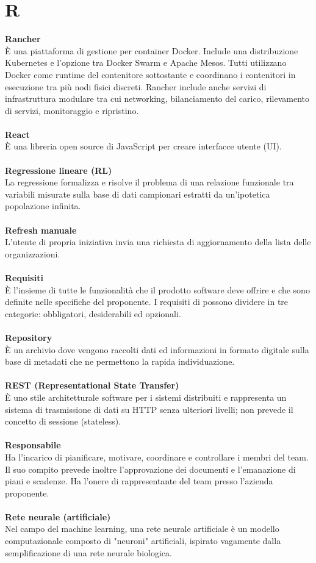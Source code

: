 \section{R}
\textbf{Rancher}\\
È una piattaforma di gestione per container Docker. Include una distribuzione Kubernetes e l'opzione tra Docker Swarm e Apache Mesos. Tutti utilizzano Docker come runtime del contenitore sottostante e coordinano i contenitori in esecuzione tra più nodi fisici discreti. Rancher include anche servizi di infrastruttura modulare tra cui networking, bilanciamento del carico, rilevamento di servizi, monitoraggio e ripristino. \\ \\
\textbf{React}\\
È una libreria open source di JavaScript per creare interfacce utente (UI). \\ \\
\textbf{Regressione lineare (RL)}\\
La regressione formalizza e risolve il problema di una relazione funzionale tra variabili misurate sulla base di dati campionari estratti da un'ipotetica popolazione infinita. \\ \\
\textbf{Refresh manuale}\\
L'utente di propria iniziativa invia una richiesta di aggiornamento della lista delle organizzazioni. \\ \\
\textbf{Requisiti}\\
È l'insieme di tutte le funzionalità che il prodotto software deve offrire e che sono definite nelle specifiche del proponente. I requisiti di possono dividere in tre categorie: obbligatori, desiderabili ed opzionali.\\ \\
\textbf{Repository}\\
È un archivio dove vengono raccolti dati ed informazioni in formato digitale sulla base di metadati che ne permettono la rapida individuazione. \\ \\
\textbf{REST (Representational State Transfer)}\\
È uno stile architetturale software per i sistemi distribuiti e rappresenta un sistema di trasmissione di dati su HTTP senza ulteriori livelli; non prevede il concetto di sessione (stateless). \\ \\
\textbf{Responsabile}\\
Ha l'incarico di pianificare, motivare, coordinare e controllare i membri del team. Il suo compito prevede inoltre l'approvazione dei documenti e l'emanazione di piani e scadenze. Ha l'onere di rappresentante del team presso l'azienda proponente. \\ \\
\textbf{Rete neurale (artificiale)}\\
Nel campo del machine learning, una rete neurale artificiale è un modello computazionale composto di "neuroni" artificiali, ispirato vagamente dalla semplificazione di una rete neurale biologica. \\ \\
\clearpage